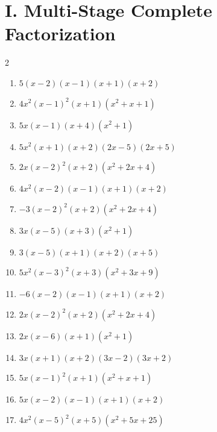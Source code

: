 \documentclass[11pt,oneside]{book}
\begin{document}
\section*{I. Multi-Stage Complete Factorization}
\begin{multicols}{2}
\begin{enumerate}[leftmargin=*,label=\textbf{I\arabic*.},itemsep=0.45\baselineskip]
\item $ 5 \left(x - 2\right) \left(x - 1\right) \left(x + 1\right) \left(x + 2\right) $
\item $ 4 x^{2} \left(x - 1\right)^{2} \left(x + 1\right) \left(x^{2} + x + 1\right) $
\item $ 5 x \left(x - 1\right) \left(x + 4\right) \left(x^{2} + 1\right) $
\item $ 5 x^{2} \left(x + 1\right) \left(x + 2\right) \left(2 x - 5\right) \left(2 x + 5\right) $
\item $ 2 x \left(x - 2\right)^{2} \left(x + 2\right) \left(x^{2} + 2 x + 4\right) $
\item $ 4 x^{2} \left(x - 2\right) \left(x - 1\right) \left(x + 1\right) \left(x + 2\right) $
\item $ - 3 \left(x - 2\right)^{2} \left(x + 2\right) \left(x^{2} + 2 x + 4\right) $
\item $ 3 x \left(x - 5\right) \left(x + 3\right) \left(x^{2} + 1\right) $
\item $ 3 \left(x - 5\right) \left(x + 1\right) \left(x + 2\right) \left(x + 5\right) $
\item $ 5 x^{2} \left(x - 3\right)^{2} \left(x + 3\right) \left(x^{2} + 3 x + 9\right) $
\item $ - 6 \left(x - 2\right) \left(x - 1\right) \left(x + 1\right) \left(x + 2\right) $
\item $ 2 x \left(x - 2\right)^{2} \left(x + 2\right) \left(x^{2} + 2 x + 4\right) $
\item $ 2 x \left(x - 6\right) \left(x + 1\right) \left(x^{2} + 1\right) $
\item $ 3 x \left(x + 1\right) \left(x + 2\right) \left(3 x - 2\right) \left(3 x + 2\right) $
\item $ 5 x \left(x - 1\right)^{2} \left(x + 1\right) \left(x^{2} + x + 1\right) $
\item $ 5 x \left(x - 2\right) \left(x - 1\right) \left(x + 1\right) \left(x + 2\right) $
\item $ 4 x^{2} \left(x - 5\right)^{2} \left(x + 5\right) \left(x^{2} + 5 x + 25\right) $

\end{enumerate}
\end{multicols}
\end{document}
